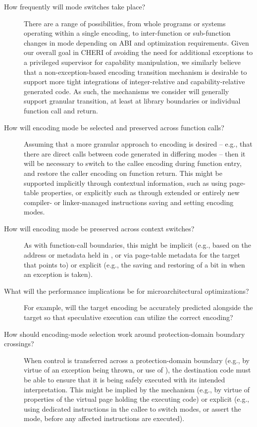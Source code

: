 \begin{description}
\item[How frequently will mode switches take place?]
  There are a range of possibilities, from whole programs or systems operating
  within a single encoding, to inter-function or sub-function changes in mode
  depending on ABI and optimization requirements.
  Given our overall goal in CHERI of avoiding the need for additional
  exceptions to a privileged supervisor for capability manipulation, we
  similarly believe that a non-exception-based encoding transition mechanism
  is desirable to support more tight integrations of integer-relative and
  capability-relative generated code.
  As such, the mechanisms we consider will generally support granular
  transition, at least at library boundaries or individual function call and
  return.

\item[How will encoding mode be selected and preserved across function calls?]
  Assuming that a more granular approach to encoding is desired -- e.g., that
  there are direct calls between code generated in differing modes -- then it
  will be necessary to switch to the callee encoding during function entry,
  and restore the caller encoding on function return.
  This might be supported implicitly through contextual information, such as
  using page-table properties, or explicitly such as through extended or
  entirely new compiler- or linker-managed instructions saving and setting
  encoding modes.

\item[How will encoding mode be preserved across context switches?]
  As with function-call boundaries, this might be implicit (e.g., based on the
  address or metadata held in \PCC{}, or via page-table metadata for the
  target that \PCC{} points to) or explicit
  (e.g., the saving and restoring of a bit in \xccsr{} when an exception is taken).

\item[What will the performance implications be for microarchitectural
  optimizations?]
  For example, will the target encoding be accurately predicted alongside the
  target \PCC{,} so that speculative execution can utilize the correct
  encoding?

\item[How should encoding-mode selection work around protection-domain
  boundary crossings?]
  When control is transferred across a protection-domain boundary (e.g.,
  by virtue of an exception being thrown, or use of ), the
  destination code must be able to ensure that it is being safely executed
  with its intended interpretation.
  This might be implied by the mechanism (e.g., by virtue of properties of the
  virtual page holding the executing code) or explicit (e.g., using
  dedicated instructions in the callee to switch modes, or assert the mode,
  before any affected instructions are executed).


\end{description}
